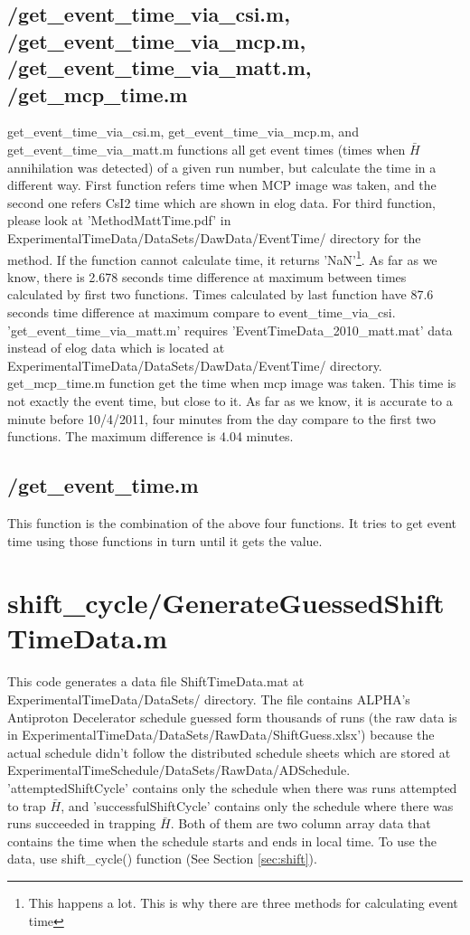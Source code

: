 \documentclass[12pt]{report}
\begin{document}
\subsection{/get\_event\_time\_via\_csi.m, /get\_event\_time\_via\_mcp.m, /get\_event\_time\_via\_matt.m, /get\_mcp\_time.m}
get\_event\_time\_via\_csi.m, get\_event\_time\_via\_mcp.m, and get\_event\_time\_via\_matt.m functions all get event times (times when $\bar{H}$ annihilation was detected) of a given run number, but calculate the time in a different way. First function refers time when MCP image was taken, and the second one refers CsI2 time which are shown in elog data. For third function, please look at 'MethodMattTime.pdf' in ExperimentalTimeData/DataSets/DawData/EventTime/ directory for the method. If the function cannot calculate time, it returns 'NaN'\footnote{This happens a lot. This is why there are three methods for calculating event time}. As far as we know, there is 2.678 seconds time difference at maximum between times calculated by first two functions. Times calculated by last function have 87.6 seconds time difference at maximum compare to event\_time\_via\_csi. 'get\_event\_time\_via\_matt.m' requires 'EventTimeData\_2010\_matt.mat' data instead of elog data which is located at ExperimentalTimeData/DataSets/DawData/EventTime/ directory. get\_mcp\_time.m function get the time when mcp image was taken. This time is not exactly the event time, but close to it. As far as we know, it is accurate to a minute before 10/4/2011, four minutes from the day compare to the first two functions. The maximum difference is 4.04 minutes.

\subsection{/get\_event\_time.m}
This function is the combination of the above four functions. It tries to get event time using those functions in turn until it gets the value.


\section{shift\_cycle/GenerateGuessedShiftTimeData.m}
This code generates a data file ShiftTimeData.mat at ExperimentalTimeData/DataSets/ directory. The file contains ALPHA's Antiproton Decelerator schedule guessed form thousands of runs (the raw data is in ExperimentalTimeData/DataSets/RawData/ShiftGuess.xlsx') because the actual schedule didn't follow the distributed schedule sheets which are stored at ExperimentalTimeSchedule/DataSets/RawData/ADSchedule. 'attemptedShiftCycle' contains only the schedule when there was runs attempted to trap $\bar{H}$, and 'successfulShiftCycle' contains only the schedule where there was runs succeeded in trapping $\bar{H}$. Both of them are two column array data that contains the time when the schedule starts and ends in local time. To use the data, use shift\_cycle() function (See Section \ref{sec:shift}).
\end{document}
